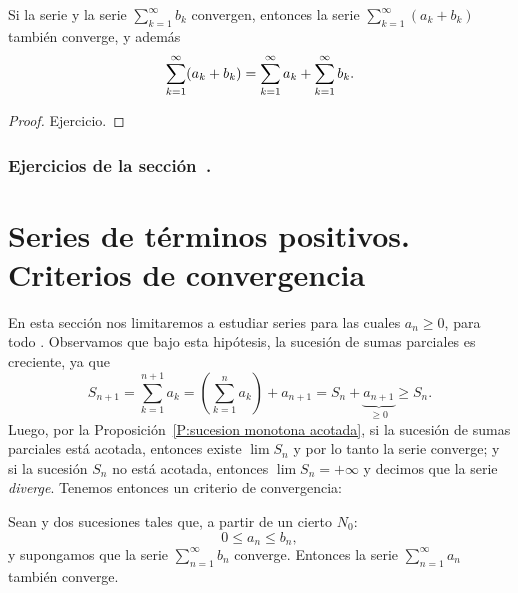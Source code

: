 \begin{lemma}  
Si la serie \serieak y la serie $\sum_{k=1}^\infty b_k$ convergen, entonces la serie $\sum_{k=1}^\infty (a_k+b_k)$ también converge, y además
\[
\sum_{k=1}^\infty (a_k+b_k) = \sum_{k=1}^\infty a_k + \sum_{k=1}^\infty b_k.
\]
\end{lemma}

\begin{proof}
    Ejercicio.
\end{proof}

\subsubsection*{Ejercicios de la sección~.}

\begin{enumerate}

\end{enumerate}

\section{Series de términos positivos. \\ Criterios de convergencia}

En esta sección nos limitaremos a estudiar series \seriean para las cuales $a_n\ge 0$, para todo \niN. 
Observamos que bajo esta hipótesis, la sucesión de sumas parciales es creciente, ya que
\[
S_{n+1} =  \sum_{k=1}^{n+1} a_k = \left( \sum_{k=1}^n a_k \right) + a_{n+1} 
= S_n + \underbrace{a_{n+1}}_{\ge 0} \ge S_n.
\]
Luego, por la Proposición~\ref{P:sucesion monotona acotada}, si la sucesión de sumas parciales está acotada, entonces existe $\lim S_n$ y por lo tanto la serie \seriean converge; y si la sucesión $S_n$ no está acotada, entonces $\lim S_n = +\infty$ y decimos que la serie \emph{diverge}. Tenemos entonces un criterio de convergencia:

\begin{proposition}\label{P:series comparacion} 
   Sean \sucan y \sucbn dos sucesiones tales que, a partir de un cierto $N_0$:
   \[
   0 \le a_n \le b_n,
   \]
   y supongamos que la serie $\sum_{n=1}^\infty b_n$ converge. Entonces la serie $\sum_{n=1}^\infty a_n$ también converge.
\end{proposition}

